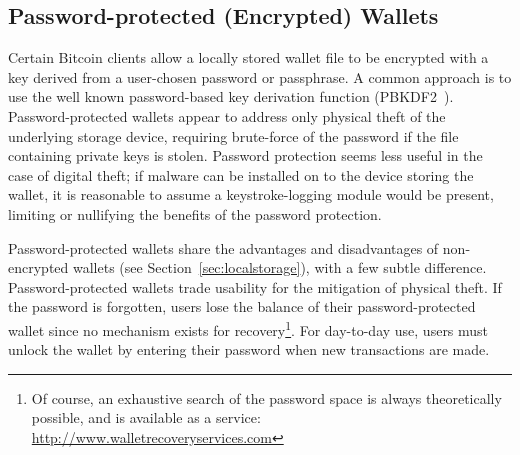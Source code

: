 
\subsection{Password-protected (Encrypted) Wallets}
Certain Bitcoin clients allow a locally stored wallet file to be encrypted with a key derived from a user-chosen password or passphrase. A common approach is to use the well known password-based key derivation function (PBKDF2~\cite{pbkdf2}). Password-protected wallets appear to address only physical theft of the underlying storage device, requiring brute-force of the password if the file containing private keys is stolen. Password protection seems less useful in the case of digital theft; if malware can be installed on to the device storing the wallet, it is reasonable to assume a keystroke-logging module would be present, limiting or nullifying the benefits of the password protection.

Password-protected wallets share the advantages and disadvantages of non-encrypted wallets (see Section~\ref{sec:localstorage}), with a few subtle difference. Password-protected wallets trade usability for the mitigation of physical theft. If the password is forgotten, users lose the balance of their password-protected wallet since no mechanism exists for recovery\footnote{Of course, an exhaustive search of the password space is always theoretically possible, and is available as a service: \url{http://www.walletrecoveryservices.com}}. For day-to-day use, users must unlock the wallet by entering their password when new transactions are made. 


